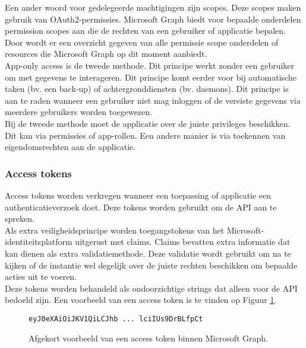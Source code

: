 Een ander woord voor gedelegeerde machtigingen zijn scopes. Deze scopes maken gebruik van OAuth2-permissies. Microsoft Graph biedt voor bepaalde onderdelen permission scopes aan die de rechten van een gebruiker of applicatie bepalen. Door \textcite{Microsoft2023p} wordt er een overzicht gegeven van alle permissie scope onderdelen of resources die Microsoft Graph op dit moment aanbiedt. \\


App-only access is de tweede methode. Dit principe werkt zonder een gebruiker om met gegevens te interageren. Dit principe komt eerder voor bij automatische taken (bv. een back-up) of achtergronddiensten (bv. daemons). Dit principe is aan te raden wanneer een gebruiker niet mag inloggen of de vereiste gegevens via meerdere gebruikers worden toegewezen. \\

Bij de tweede methode moet de applicatie over de juiste privileges beschikken. Dit kan via permissies of app-rollen. Een andere manier is via toekennen van eigendomsrechten aan de applicatie. 

\subsubsection{Access tokens}

Access tokens worden verkregen wanneer een toepassing of applicatie een authenticatieverzoek doet. Deze tokens worden gebruikt om de \ac{API} aan te spreken. \\

Als extra veiligheidsprincipe worden toegangstokens van het Microsoft-\newline
identiteitsplatform uitgerust met claims. Claims bevatten extra informatie dat kan dienen als extra validatiemethode. Deze validatie wordt gebruikt om na te kijken of de instantie wel degelijk over de juiste rechten beschikken om bepaalde acties uit te voeren. \\

Deze tokens worden behandeld als ondoorzichtige strings dat alleen voor de \ac{API} bedoeld zijn. Een voorbeeld van een access token is te vinden op Figuur \ref{MSGAT}. \\

\begin{figure}[h]
    \footnotesize\begin{verbatim}eyJ0eXAiOiJKV1QiLCJhb ... lciIUs9DrBLfpCt
\end{verbatim}    
    \caption[Afgekort voorbeeld Microsoft Graph access token]{Afgekort voorbeeld van een access token binnen Microsoft Graph.}
    \label{MSGAT}
\end{figure}

